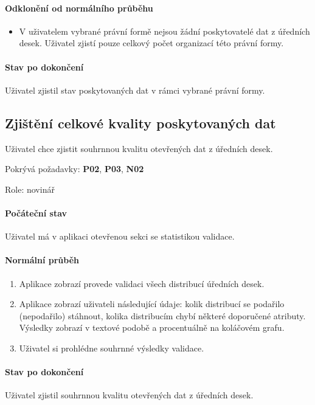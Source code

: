 \paragraph{Odklonění od normálního průběhu}
\begin{itemize}
    \item V uživatelem vybrané právní formě nejsou žádní poskytovatelé dat z úředních desek. Uživatel zjistí pouze celkový počet organizací této právní formy.
\end{itemize}

\paragraph{Stav po dokončení}
Uživatel zjistil stav poskytovaných dat v rámci vybrané právní formy.

\subsection{Zjištění celkové kvality poskytovaných dat} \label{use-case:celaVal}

Uživatel chce zjistit souhrnnou kvalitu otevřených dat z úředních desek.

Pokrývá požadavky: \textbf{P02}, \textbf{P03}, \textbf{N02}  

Role: novinář

\paragraph{Počáteční stav} 
Uživatel má v aplikaci otevřenou sekci se statistikou validace.

\paragraph{Normální průběh}
\begin{enumerate}
    \item Aplikace zobrazí provede validaci všech distribucí úředních desek.
    \item Aplikace zobrazí uživateli následující údaje: kolik distribucí se podařilo (nepodařilo) stáhnout, kolika distribucím chybí některé doporučené atributy. Výsledky zobrazí v textové podobě a procentuálně na koláčovém grafu.
    \item Uživatel si prohlédne souhrnné výsledky validace.
\end{enumerate}

\paragraph{Stav po dokončení}
Uživatel zjistil souhrnnou kvalitu otevřených dat z úředních desek.

